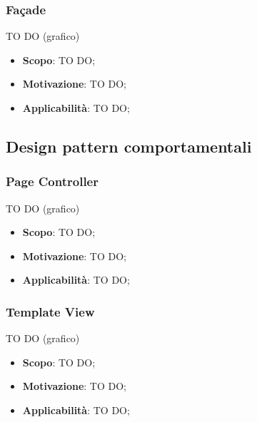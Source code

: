 		\subsubsection{Fa\c{c}ade} %
		TO DO (grafico)
		\begin{itemize}
			\item \textbf{Scopo}: TO DO;
			\item \textbf{Motivazione}: TO DO;
			\item \textbf{Applicabilità}: TO DO;
		\end{itemize}




	\clearpage \newpage

	\subsection{Design pattern comportamentali} %
		\subsubsection{Page Controller} %
		TO DO (grafico)
		\begin{itemize}
			\item \textbf{Scopo}: TO DO;
			\item \textbf{Motivazione}: TO DO;
			\item \textbf{Applicabilità}: TO DO;
		\end{itemize}

		\subsubsection{Template View} %
		TO DO (grafico)
		\begin{itemize}
			\item \textbf{Scopo}: TO DO;
			\item \textbf{Motivazione}: TO DO;
			\item \textbf{Applicabilità}: TO DO;
		\end{itemize}



